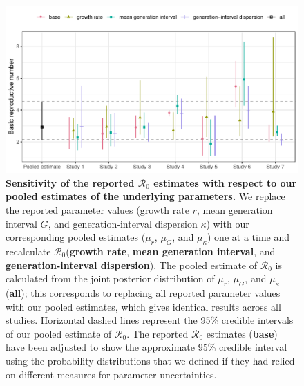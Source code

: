 \documentclass[12pt]{article}
\newcommand{\Ro}{\ensuremath{{\mathcal R}_{0}}\xspace}
\begin{document}
\begin{figure}[!th]
\includegraphics[width=\textwidth]{compare_R0.pdf}
\caption{
\textbf{Sensitivity of the reported \Ro estimates with respect to our pooled estimates of the underlying parameters.}
We replace the reported parameter values (growth rate $r$, mean generation interval $\bar G$, and generation-interval dispersion $\kappa$) with our corresponding pooled estimates ($\mu_r$, $\mu_G$, and $\mu_\kappa$) one at a time and recalculate \Ro (\textbf{growth rate}, \textbf{mean generation interval}, and \textbf{generation-interval dispersion}).
The pooled estimate of \Ro is calculated from the joint posterior distribution of $\mu_r$, $\mu_G$, and $\mu_\kappa$ (\textbf{all});
this corresponds to replacing all reported parameter values with our pooled estimates, which gives identical results across all studies.
Horizontal dashed lines represent the 95\% credible intervals of our pooled estimate of \Ro.
The reported \Ro estimates (\textbf{base}) have been adjusted to show the approximate 95\% credible interval using the probability distributions that we defined if they had relied on different measures for parameter uncertainties.
}
\label{fig:R0}
\end{figure}
\end{document}
